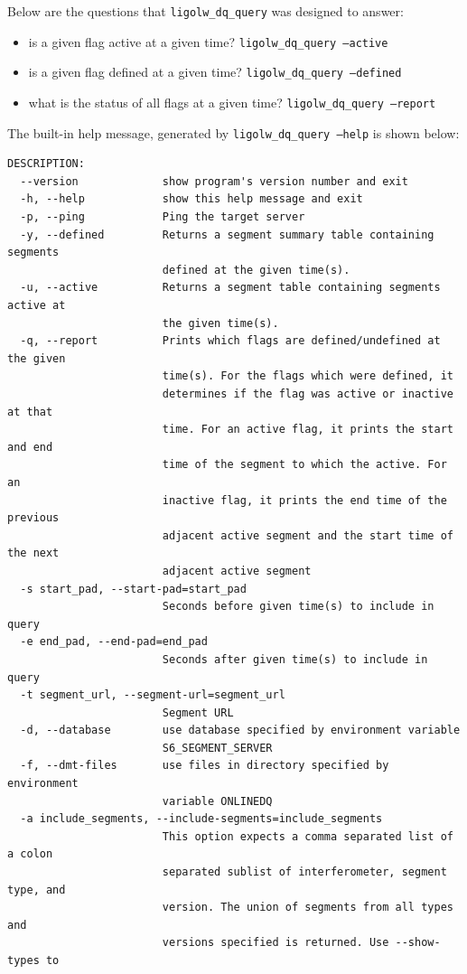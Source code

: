 Below are the questions that \texttt{ligolw\_dq\_query} was designed
to answer:
%
\begin{itemize}
\item is a given flag active at a given time?
\texttt{ligolw\_dq\_query --active}
\item is a given flag defined at a given time?
\texttt{ligolw\_dq\_query --defined}
\item what is the status of all flags at a given time?
\texttt{ligolw\_dq\_query --report}
\end{itemize}
%
The built-in help message, generated by \texttt{ligolw\_dq\_query
--help} is shown below:
%
{\small
\begin{verbatim}
DESCRIPTION:
  --version             show program's version number and exit
  -h, --help            show this help message and exit
  -p, --ping            Ping the target server
  -y, --defined         Returns a segment summary table containing segments
                        defined at the given time(s).
  -u, --active          Returns a segment table containing segments active at
                        the given time(s).
  -q, --report          Prints which flags are defined/undefined at the given
                        time(s). For the flags which were defined, it
                        determines if the flag was active or inactive at that
                        time. For an active flag, it prints the start and end
                        time of the segment to which the active. For an
                        inactive flag, it prints the end time of the previous
                        adjacent active segment and the start time of the next
                        adjacent active segment
  -s start_pad, --start-pad=start_pad
                        Seconds before given time(s) to include in query
  -e end_pad, --end-pad=end_pad
                        Seconds after given time(s) to include in query
  -t segment_url, --segment-url=segment_url
                        Segment URL
  -d, --database        use database specified by environment variable
                        S6_SEGMENT_SERVER
  -f, --dmt-files       use files in directory specified by environment
                        variable ONLINEDQ
  -a include_segments, --include-segments=include_segments
                        This option expects a comma separated list of a colon
                        separated sublist of interferometer, segment type, and
                        version. The union of segments from all types and
                        versions specified is returned. Use --show-types to

\end{verbatim}}
